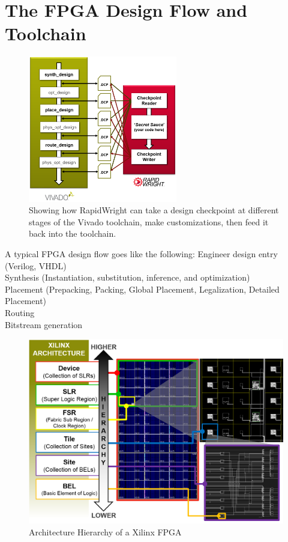 \documentclass[twocolumn]{article}
\begin{document}


\section{The FPGA Design Flow and Toolchain}
    \begin{figure}
        \centering
        \includegraphics[width=6.5cm]{figures/vivado_dcps.png}
        \caption{Showing how RapidWright can take a design checkpoint at different stages of the Vivado toolchain, make customizations, then feed it back into the toolchain.}
        \label{fig:device_carry_chain_routing}
    \end{figure}
    A typical FPGA design flow goes like the following:
    Engineer design entry (Verilog, VHDL) \\
    Synthesis (Instantiation, substitution, inference, and optimization) \\ 
    Placement (Prepacking, Packing, Global Placement, Legalization, Detailed Placement)\\ 
    Routing \\ 
    Bitstream generation \\ 

\begin{figure}
    \centering
    \includegraphics[width=\textwidth]{figures/hierarchy.png}
    \caption{Architecture Hierarchy of a Xilinx FPGA}\label{fig:hierarchy}
\end{figure}
\end{document}
